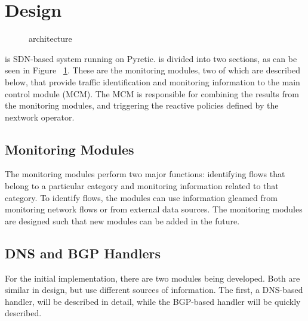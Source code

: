 \section{Design}

\begin{figure}
    \centering
    \caption{\system{} architecture}
    \label{fig:architecture}
\end{figure}


\system{} is SDN-based system running on Pyretic.\cite{pyretic} 
\system{} is divided into two sections, as can be seen in Figure~
\ref{fig:architecture}. These are the monitoring modules, two of which are described below, that provide traffic identification and monitoring information to the main control module (MCM). The MCM is responsible for combining the results from the monitoring modules, and triggering the reactive policies defined by the nextwork operator.

\subsection{Monitoring Modules}
The monitoring modules perform two major functions: identifying flows that belong to a particular category and monitoring information related to that category. To identify flows, the modules can use information gleamed from monitoring network flows or from external data sources. The monitoring modules are designed such that new modules can be added in the future.

\subsection{DNS and BGP Handlers}
For the initial implementation, there are two modules being developed. Both are similar in design, but use different sources of information. The first, a DNS-based handler, will be described in detail, while the BGP-based handler will be quickly described.

